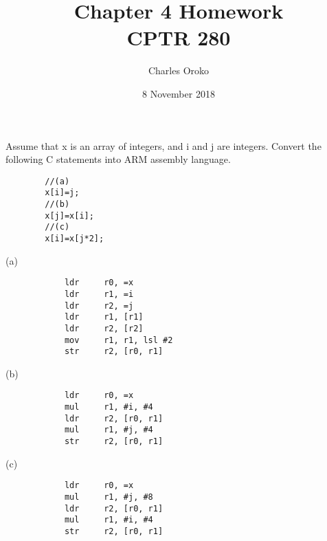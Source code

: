 \documentclass[12pt]{article}
\newenvironment{exercise}[2][Exercise]{\begin{trivlist}
\item[\hskip \labelsep {\bfseries #1}\hskip \labelsep {\bfseries #2.}]}{\end{trivlist}}
\newenvironment{solution}[2][Solution]{\begin{trivlist}
\item[\hskip \labelsep {\bfseries #1}]}{\end{trivlist}}
\begin{document}
 
 
\title{Chapter 4 Homework\\CPTR 280}%
\author{Charles Oroko} %
\date{8 November 2018}
\maketitle


\begin{exercise}{3.10}
    Assume that x is an array of integers, and i and j are integers. Convert the following C statements into ARM assembly language.
    \begin{verbatim}
        //(a)
        x[i]=j;
        //(b)
        x[j]=x[i];
        //(c)
        x[i]=x[j*2];
    \end{verbatim}

    \begin{solution}((a)
        \begin{verbatim}
            ldr     r0, =x
            ldr     r1, =i
            ldr     r2, =j
            ldr     r1, [r1]
            ldr     r2, [r2]
            mov     r1, r1, lsl #2
            str     r2, [r0, r1]
        \end{verbatim}
    \end{solution}
    \begin{solution}((b)
        \begin{verbatim}
            ldr     r0, =x
            mul     r1, #i, #4
            ldr     r2, [r0, r1]
            mul     r1, #j, #4
            str     r2, [r0, r1]
        \end{verbatim}
    \end{solution}
    \begin{solution}((c)
        \begin{verbatim}
            ldr     r0, =x
            mul     r1, #j, #8
            ldr     r2, [r0, r1]
            mul     r1, #i, #4
            str     r2, [r0, r1]
        \end{verbatim}
    \end{solution}
\end{exercise}
\end{document}
